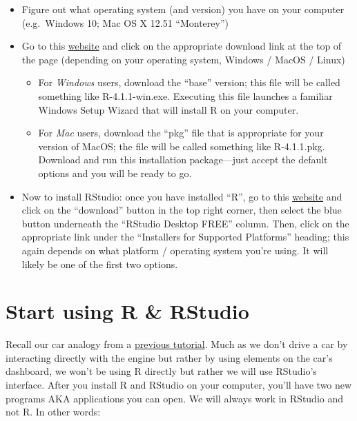 \documentclass[
]{book}
\providecommand{\tightlist}{%
  \setlength{\itemsep}{0pt}\setlength{\parskip}{0pt}}
\begin{document}
\begin{itemize}
\tightlist
\item
  Figure out what operating system (and version) you have on your computer (e.g.~Windows 10; Mac OS X 12.51 ``Monterey'')\\
\item
  Go to this \href{https://cran.r-project.org/}{website} and click on the appropriate download link at the top of the page (depending on your operating system, Windows / MacOS / Linux)

  \begin{itemize}
  \tightlist
  \item
    For \emph{Windows} users, download the ``base'' version; this file will be called something like R-4.1.1-win.exe. Executing this file launches a familiar Windows Setup Wizard that will install R on your computer.\\
  \item
    For \emph{Mac} users, download the ``pkg'' file that is appropriate for your version of MacOS; the file will be called something like R-4.1.1.pkg. Download and run this installation package---just accept the default options and you will be ready to go.
  \end{itemize}
\item
  Now to install RStudio: once you have installed ``R'', go to this \href{https://rstudio.com/products/rstudio/download/}{website} and click on the ``download'' button in the top right corner, then select the blue button underneath the ``RStudio Desktop FREE'' column. Then, click on the appropriate link under the ``Installers for Supported Platforms'' heading; this again depends on what platform / operating system you're using. It will likely be one of the first two options.
\end{itemize}

\chapter{Start using R \& RStudio}\label{start_r}

Recall our car analogy from a \hyperref[what_is_R]{previous tutorial}. Much as we don't drive a car by interacting directly with the engine but rather by using elements on the car's dashboard, we won't be using R directly but rather we will use RStudio's interface. After you install R and RStudio on your computer, you'll have two new programs AKA applications you can open. We will always work in RStudio and not R. In other words:
\end{document}

